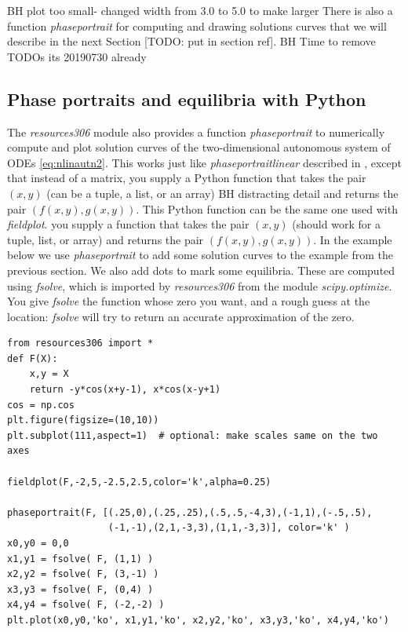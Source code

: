 \documentclass[12pt]{book}
\begin{document}
{\color{teal}BH plot too small- changed width from 3.0 to 5.0 to make larger}
{\color{red}
\noindent There is also a function \emph{phaseportrait} for computing and drawing solutions curves that we will
describe in the next Section [TODO: put in section ref]. 
}
{\color{teal}BH Time to remove TODOs its 20190730 already}



\sectionnewpage
\subsection{Phase portraits and equilibria with Python}

The \emph{resources306} module also provides a function \emph{phaseportrait} 
to numerically compute and plot solution curves of the two-dimensional autonomous system of ODEs \eqref{eq:nlinautn2}. 
This works just like \emph{phaseportraitlinear} described in , except
that instead of a matrix, 
you supply a Python function that takes the pair $(x,y)$ 
{\color{red}(can be a tuple, a list, or an array)}
{\color{teal}BH distracting detail}
and returns the pair $(f(x,y),g(x,y))$.
{\color{blue}This Python function can be the same one used with \emph{fieldplot}.}
{\color{red}
you supply a function that takes the pair $(x,y)$ (should work for a tuple, list, or array)
and returns the pair $(f(x,y),g(x,y))$.}
In the example below we use \emph{phaseportrait} to add some solution curves to the example from the previous
section. We also add dots to mark some equilibria. These are computed using \emph{fsolve}, which is imported by \emph{resources306} from the module
\emph{scipy.optimize}. You give \emph{fsolve} the function whose zero you want, and a rough guess at the location: \emph{fsolve} will
try to return an accurate approximation of the zero.
\begin{small}
\begin{verbatim}
from resources306 import *
def F(X):
    x,y = X
    return -y*cos(x+y-1), x*cos(x-y+1)
cos = np.cos
plt.figure(figsize=(10,10))
plt.subplot(111,aspect=1)  # optional: make scales same on the two axes

fieldplot(F,-2,5,-2.5,2.5,color='k',alpha=0.25)

phaseportrait(F, [(.25,0),(.25,.25),(.5,.5,-4,3),(-1,1),(-.5,.5),
                  (-1,-1),(2,1,-3,3),(1,1,-3,3)], color='k' )
x0,y0 = 0,0
x1,y1 = fsolve( F, (1,1) )
x2,y2 = fsolve( F, (3,-1) )
x3,y3 = fsolve( F, (0,4) )
x4,y4 = fsolve( F, (-2,-2) )
plt.plot(x0,y0,'ko', x1,y1,'ko', x2,y2,'ko', x3,y3,'ko', x4,y4,'ko')
\end{verbatim}
\end{small}
\end{document}
